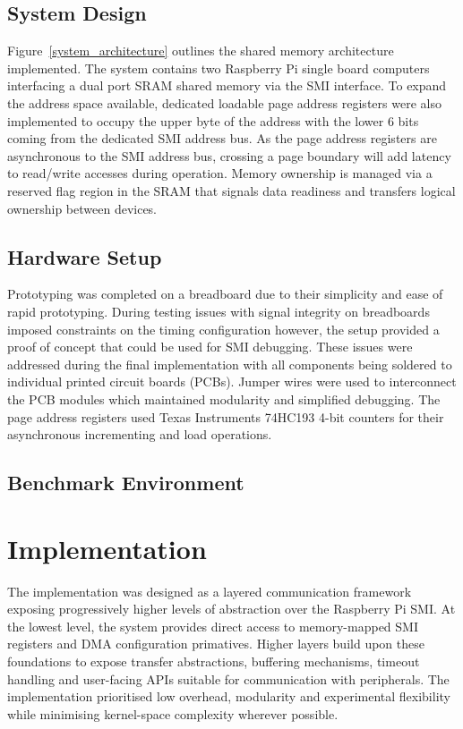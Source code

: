 \documentclass[final]{cmpreport}
\begin{document}
\subsection{System Design}
Figure~\ref{system_architecture} outlines the shared memory architecture implemented. The system contains two Raspberry Pi single board computers interfacing a dual port SRAM shared memory via the SMI interface. To expand the address space available, dedicated loadable page address registers were also implemented to occupy the upper byte of the address with the lower 6 bits coming from the dedicated SMI address bus. As the page address registers are asynchronous to the SMI address bus, crossing a page boundary will add latency to read/write accesses during operation. Memory ownership is managed via a reserved flag region in the SRAM that signals data readiness and transfers logical ownership between devices.

\subsection{Hardware Setup}
Prototyping was completed on a breadboard due to their simplicity and ease of rapid prototyping. During testing issues with signal integrity on breadboards imposed constraints on the timing configuration however, the setup provided a proof of concept that could be used for SMI debugging. These issues were addressed during the final implementation with all components being soldered to individual printed circuit boards (PCBs). Jumper wires were used to interconnect the PCB modules which maintained modularity and simplified debugging. The page address registers used Texas Instruments 74HC193 4-bit counters for their asynchronous incrementing and load operations.

\subsection{Benchmark Environment}


\section{Implementation}
The implementation was designed as a layered communication framework exposing progressively higher levels of abstraction over the Raspberry Pi SMI. At the lowest level, the system provides direct access to memory-mapped SMI registers and DMA configuration primatives. Higher layers build upon these foundations to expose transfer abstractions, buffering mechanisms, timeout handling and user-facing APIs suitable for communication with peripherals. The implementation prioritised low overhead, modularity and experimental flexibility while minimising kernel-space complexity wherever possible.
\end{document}

